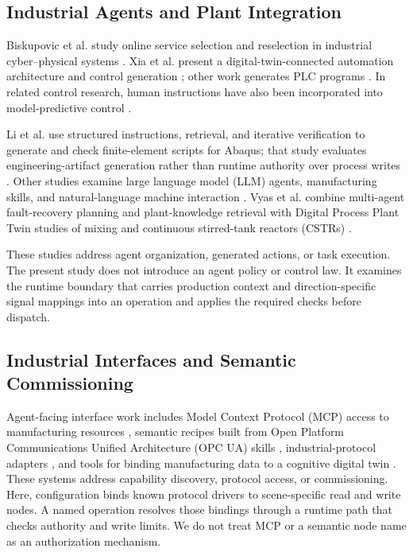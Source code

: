 \documentclass[journal]{IEEEtran}
\begin{document}
\subsection{Industrial Agents and Plant Integration}
Biskupovic et al. study online service selection and reselection in industrial cyber--physical systems \cite{biskupovic2025supervision}. Xia et al. present a digital-twin-connected automation architecture and control generation \cite{xia2025architecture,xia2025control}; other work generates PLC programs \cite{liu2026agents4plc}. In related control research, human instructions have also been incorporated into model-predictive control \cite{wu2025instructmpc}.

Li et al. use structured instructions, retrieval, and iterative verification to generate and check finite-element scripts for Abaqus; that study evaluates engineering-artifact generation rather than runtime authority over process writes \cite{li2026modsolagent}. Other studies examine large language model (LLM) agents, manufacturing skills, and natural-language machine interaction \cite{koehle2026llmdriven,lim2025llmenabled,zhao2026shopfloor,hofmann2025nlc}. Vyas et al. combine multi-agent fault-recovery planning and plant-knowledge retrieval with Digital Process Plant Twin studies of mixing and continuous stirred-tank reactors (CSTRs) \cite{vyas2026detection}.

These studies address agent organization, generated actions, or task execution. The present study does not introduce an agent policy or control law. It examines the runtime boundary that carries production context and direction-specific signal mappings into an operation and applies the required checks before dispatch.

\subsection{Industrial Interfaces and Semantic Commissioning}
Agent-facing interface work includes Model Context Protocol (MCP) access to manufacturing resources \cite{silva2025mcpmanufacturing}, semantic recipes built from Open Platform Communications Unified Architecture (OPC UA) skills \cite{koehle2025semanticrecipes}, industrial-protocol adapters \cite{xavier2026industriConnect}, and tools for binding manufacturing data to a cognitive digital twin \cite{liu2026semanticcommissioning}. These systems address capability discovery, protocol access, or commissioning. Here, configuration binds known protocol drivers to scene-specific read and write nodes. A named operation resolves those bindings through a runtime path that checks authority and write limits. We do not treat MCP or a semantic node name as an authorization mechanism.
\end{document}
